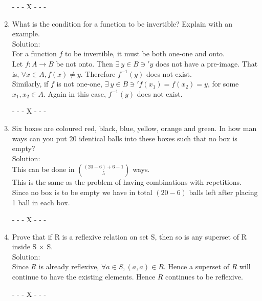 \documentclass{article}
\begin{document}
\begin{enumerate}
 \begin{center}
- - - X - - -
\end{center}
    
    \item What is the condition for a function to be invertible? Explain with an example. \\
    
    Solution: \\ 
    For a function $f$ to be invertible, it must be both one-one and onto.\\
    
    Let $f:A \rightarrow B$ be not onto. Then $\exists\  y \in B \ni' y$ does not have a pre-image. That is, $\forall x \in A, f(x) \neq y$. Therefore $f^{-1}(y)$ does not exist. \\ 
    Similarly, if $f$ is not one-one, $\exists\  y \in B \ni' f(x_1)=f(x_2)=y$, for some $x_1,x_2 \in A$. Again in this case, $f^{-1}(y)$ does not exist.
   
   
   
\begin{center}
- - - X - - -
\end{center}
    
    \item Six boxes are coloured red, black, blue, yellow, orange and green. In how man ways can you
put 20 identical balls into these boxes such that no box is empty?\\
Solution: \\
This can be done in ${(20-6) + 6 - 1 }\choose 5$ ways. \\
This is the same as the problem of having combinations with repetitions. Since no box is to be empty we have in total $(20-6)$ balls left after placing 1 ball in each box. 
 \begin{center}
- - - X - - -
\end{center}

    \item Prove that if R is a reflexive relation on set S, then so is any superset of R inside S $\times$ S.\\
    Solution: \\
    
    Since $R$ is already reflexive, $\forall a \in S, (a,a) \in R$. Hence a superset of $R$ will continue to  have the existing elements. Hence $R$ continues to be reflexive. 
\begin{center}
- - - X - - -
\end{center}
    

\end{enumerate}
\end{document}
